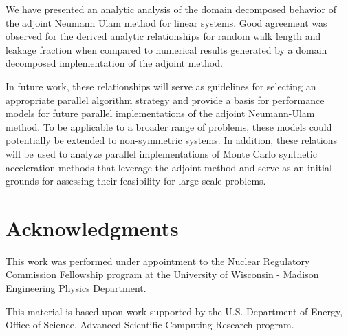 \documentclass[preprint,11pt]{elsarticle}
\begin{document}
We have presented an analytic analysis of the domain decomposed
behavior of the adjoint Neumann Ulam method for linear systems. Good
agreement was observed for the derived analytic relationships for
random walk length and leakage fraction when compared to numerical
results generated by a domain decomposed implementation of the adjoint
method.

In future work, these relationships will serve as guidelines for
selecting an appropriate parallel algorithm strategy and provide a
basis for performance models for future parallel implementations of
the adjoint Neumann-Ulam method. To be applicable to a broader range
of problems, these models could potentially be extended to
non-symmetric systems. In addition, these relations will be used to
analyze parallel implementations of Monte Carlo synthetic acceleration
methods that leverage the adjoint method and serve as an initial
grounds for assessing their feasibility for large-scale problems.

\section{Acknowledgments}
This work was performed under appointment to the Nuclear Regulatory
Commission Fellowship program at the University of Wisconsin - Madison
Engineering Physics Department.

This material is based upon work supported by the U.S. Department of
Energy, Office of Science, Advanced Scientific Computing Research
program.

 
\end{document}
